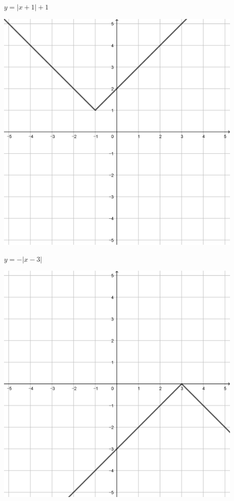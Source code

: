 \documentclass[a4paper]{oblivoir}
\begin{document}
\begin{minipage}{0.45\textwidth}\centering
\(y=|x+1|+1\)
\par\bigskip\includegraphics[width=0.9\textwidth]{img/16-3}
\end{minipage}
\begin{minipage}{0.45\textwidth}\centering
\(y=-|x-3|\)
\par\bigskip\includegraphics[width=0.9\textwidth]{img/16-4}
\end{minipage}\bigskip\bigskip\par
\end{document}
